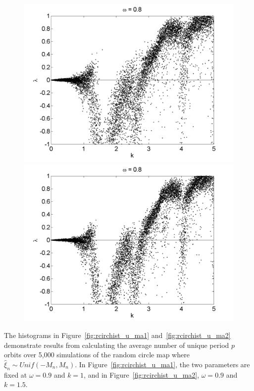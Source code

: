 \begin{figure}[!h]
\includegraphics[width=.5\textwidth]{figs/rcirc_u_lyap_10000_L_05_w_08_k.png}\hfill
\includegraphics[width=.5\textwidth]{figs/rcirc_u_lyap_10000_L_07_w_08_k.png}\\
\end{figure}

The histograms in Figure~\ref{fig:rcirchist_u_ma1}
and~\ref{fig:rcirchist_u_ma2} demonstrate results from calculating the
average number of unique period $p$ orbits over 5,000 simulations of
the random circle map where $\hat{\xi}_n\sim Unif(-M_n,M_n)$. In
Figure~\ref{fig:rcirchist_u_ma1}, the two parameters are fixed at $\omega=0.9$
and $k=1$, and in Figure~\ref{fig:rcirchist_u_ma2}, $\omega = 0.9$ and
$k=1.5$. 

